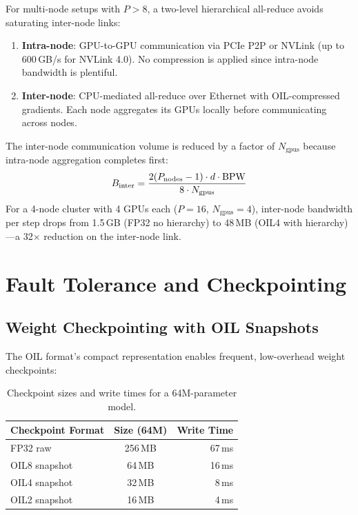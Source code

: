 For multi-node setups with $P > 8$, a two-level hierarchical all-reduce avoids saturating inter-node links:
\begin{enumerate}
    \item \textbf{Intra-node}: GPU-to-GPU communication via PCIe P2P or NVLink (up to 600\,GB/s for NVLink 4.0). No compression is applied since intra-node bandwidth is plentiful.
    \item \textbf{Inter-node}: CPU-mediated all-reduce over Ethernet with OIL-compressed gradients. Each node aggregates its GPUs locally before communicating across nodes.
\end{enumerate}
The inter-node communication volume is reduced by a factor of $N_{\text{gpus}}$ because intra-node aggregation completes first:
\[
B_{\text{inter}} = \frac{2(P_{\text{nodes}} - 1) \cdot d \cdot \textnormal{BPW}}{8 \cdot N_{\text{gpus}}}
\]
For a 4-node cluster with 4 GPUs each ($P = 16$, $N_{\text{gpus}} = 4$), inter-node bandwidth per step drops from 1.5\,GB (FP32 no hierarchy) to 48\,MB (OIL4 with hierarchy)---a 32$\times$ reduction on the inter-node link.

\section{Fault Tolerance and Checkpointing}
\label{sec:dist_fault}

\subsection{Weight Checkpointing with OIL Snapshots}

The OIL format's compact representation enables frequent, low-overhead weight checkpoints:

\begin{table}[H]
\centering
\caption{Checkpoint sizes and write times for a 64M-parameter model.}
\label{tab:checkpoint}
\begin{tabular}{lcr}
\toprule
\textbf{Checkpoint Format} & \textbf{Size (64M)} & \textbf{Write Time} \\
\midrule
FP32 raw      & 256\,MB & 67\,ms \\
OIL8 snapshot & 64\,MB  & 16\,ms \\
OIL4 snapshot & 32\,MB  & 8\,ms  \\
OIL2 snapshot & 16\,MB  & 4\,ms  \\
\bottomrule
\end{tabular}
\end{table}

